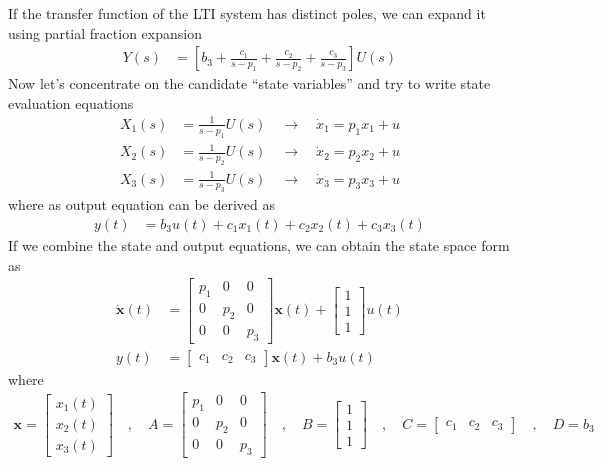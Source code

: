 \documentclass[twoside]{article}
\begin{document}
If the transfer function of the LTI system 
has distinct poles, we can expand it 
using partial fraction expansion 
%
\begin{align*}
Y(s) &= \left[ b_3 + \frac{c_1}{s - p_1} + \frac{c_2}{s - p_2} 
+ \frac{c_3}{s - p_3} \right] U(s)
\end{align*}
%
Now let's concentrate on the candidate ``state variables''
and try to write state evaluation equations
%
\begin{align*}
X_1(s) &= \frac{1}{s - p_1} U(s) \quad \rightarrow \quad \dot{x}_1 =  p_1 x_1+ u
\\
X_2(s) &= \frac{1}{s - p_2} U(s) \quad \rightarrow \quad \dot{x}_2 = p_2 x_2+ u
\\
X_3(s) &= \frac{1}{s - p_3} U(s) \quad \rightarrow \quad \dot{x}_3 = p_3 x_3 + u
\end{align*}
%
where as output equation can be derived as
%
\begin{align*}
y(t) &= b_3 u(t) + c_1 x_1(t) + c_2 x_2(t) + c_3 x_3(t)
\end{align*}
%
If we combine the state and output equations, we
can obtain the state space form as
%
%
\begin{align*}
  \dot{\mathbf{x}}(t) &= \left[ \begin{array}{ccc} p_1 & 0 & 0\\ 0 & p_2 & 0
    \\ 0 & 0 & p_3 \end{array} \right] \mathbf{x}(t)
   + 
  \left[ \begin{array}{c} 1 \\ 1
    \\ 1 \end{array} \right] u(t)
\\
y(t) &= \left[ \begin{array}{ccc} c_1 & c_2 & c_3 \end{array} \right] \mathbf{x}(t)
+ b_3 u(t)
\end{align*}
%
where 
%
\begin{align*}
\mathbf{x} = \left[ \begin{array}{c} x_1(t) \\ x_2(t) \\
x_3(t) \end{array} \right] \quad , \quad
A = \left[ \begin{array}{ccc} p_1 & 0 & 0 \\ 0 & p_2 & 0
    \\ 0 & 0 & p_3 \end{array} \right]
\quad , \quad 
B = \left[ \begin{array}{c} 1 \\ 1
    \\ 1 \end{array} \right]
\quad , \quad
C = \left[ \begin{array}{ccc} c_1 & c_2 & c_3 \end{array} \right]
\quad , \quad
D = b_3
\end{align*}
%
\end{document}
